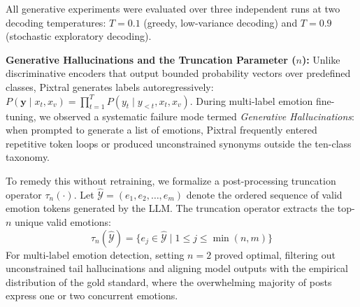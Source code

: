 All generative experiments were evaluated over three independent runs at two decoding temperatures: $T=0.1$ (greedy, low-variance decoding) and $T=0.9$ (stochastic exploratory decoding).

\noindent\textbf{Generative Hallucinations and the Truncation Parameter ($n$):} Unlike discriminative encoders that output bounded probability vectors over predefined classes, Pixtral generates labels autoregressively: $P(\mathbf{y} \mid x_t, x_v) = \prod_{t=1}^T P(y_t \mid y_{<t}, x_t, x_v)$. During multi-label emotion fine-tuning, we observed a systematic failure mode termed \textit{Generative Hallucinations}: when prompted to generate a list of emotions, Pixtral frequently entered repetitive token loops or produced unconstrained synonyms outside the ten-class taxonomy.

To remedy this without retraining, we formalize a post-processing truncation operator $\tau_n(\cdot)$. Let $\hat{\mathcal{Y}} = (e_1, e_2, \dots, e_m)$ denote the ordered sequence of valid emotion tokens generated by the LLM. The truncation operator extracts the top-$n$ unique valid emotions:
\begin{equation}
\label{eq:truncation_operator}
\tau_n(\hat{\mathcal{Y}}) = \{e_j \in \hat{\mathcal{Y}} \mid 1 \le j \le \min(n, m)\}
\end{equation}
For multi-label emotion detection, setting $n=2$ proved optimal, filtering out unconstrained tail hallucinations and aligning model outputs with the empirical distribution of the gold standard, where the overwhelming majority of posts express one or two concurrent emotions.
